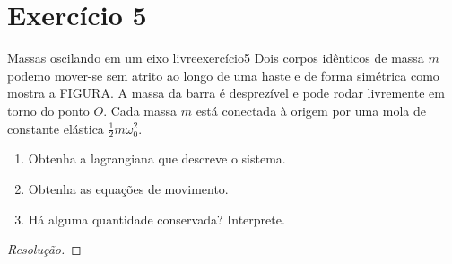 \section*{Exercício 5}
\begin{exercício}{Massas oscilando em um eixo livre}{exercício5}
    Dois corpos idênticos de massa \(m\) podemo mover-se sem atrito ao longo de uma haste e de forma simétrica como mostra a FIGURA. A massa da barra é desprezível e pode rodar livremente em torno do ponto \(O\). Cada massa \(m\) está conectada à origem por uma mola de constante elástica \(\frac12m\omega_0^2\).
    \begin{enumerate}[label=(\alph*)]
        \item Obtenha a lagrangiana que descreve o sistema.
        \item Obtenha as equações de movimento.
        \item Há alguma quantidade conservada? Interprete.
    \end{enumerate}
\end{exercício}
\begin{proof}[Resolução]

\end{proof}
